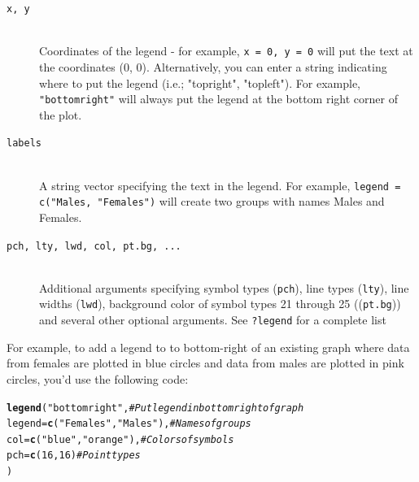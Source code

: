 \documentclass{tufte-book}\usepackage[]{graphicx}\usepackage[]{color}
\makeatletter
\newcommand{\hlnum}[1]{\textcolor[rgb]{0.686,0.059,0.569}{#1}}%
\newcommand{\hlstr}[1]{\textcolor[rgb]{0.192,0.494,0.8}{#1}}%
\newcommand{\hlcom}[1]{\textcolor[rgb]{0.678,0.584,0.686}{\textit{#1}}}%
\newcommand{\hlstd}[1]{\textcolor[rgb]{0.345,0.345,0.345}{#1}}%
\newcommand{\hlkwc}[1]{\textcolor[rgb]{0.333,0.667,0.333}{#1}}%
\newcommand{\hlkwd}[1]{\textcolor[rgb]{0.737,0.353,0.396}{\textbf{#1}}}%
\newenvironment{kframe}{%
 \def\at@end@of@kframe{}%
 \ifinner\ifhmode%
  \def\at@end@of@kframe{\end{minipage}}%
  \begin{minipage}{\columnwidth}%
 \fi\fi%
 \def\FrameCommand##1{\hskip\@totalleftmargin \hskip-\fboxsep
 \colorbox{shadecolor}{##1}\hskip-\fboxsep
     \hskip-\linewidth \hskip-\@totalleftmargin \hskip\columnwidth}%
 \MakeFramed {\advance\hsize-\width
   \@totalleftmargin\z@ \linewidth\hsize
   \@setminipage}}%
 {\par\unskip\endMakeFramed%
 \at@end@of@kframe}
\newenvironment{knitrout}{}{} %
\makeatother
\begin{document}
\begin{footnotesize}
{{\hline

\begin{description}

\item[\tt{x, y}] \hfill \\
Coordinates of the legend - for example, \texttt{x = 0, y = 0} will put the text at the coordinates (0, 0). Alternatively, you can enter a string indicating where to put the legend (i.e.; "topright", "topleft"). For example, \texttt{"bottomright"} will always put the legend at the bottom right corner of the plot.

\item[\tt{labels}] \hfill \\
  A string vector specifying the text in the legend. For example, \texttt{legend = c("Males, "Females")} will create two groups with names Males and Females.
  
\item[\tt{pch, lty, lwd, col, pt.bg, ...}] \hfill \\
Additional arguments specifying symbol types (\texttt{pch}), line types (\texttt{lty}), line widths (\texttt{lwd}), background color of symbol types 21 through 25 ((\texttt{pt.bg})) and several other optional arguments. See \texttt{?legend} for a complete list


\end{description}

}
}
\vspace{5mm} %


For example, to add a legend to to bottom-right of an existing graph where data from females are plotted in blue circles and data from males are plotted in pink circles, you'd use the following code:

\begin{knitrout}
\color{fgcolor}\begin{kframe}
\begin{alltt}
\hlkwd{legend}\hlstd{(}\hlstr{"bottomright"}\hlstd{,} \hlcom{# Put legend in bottom right of graph}
       \hlkwc{legend} \hlstd{=} \hlkwd{c}\hlstd{(}\hlstr{"Females"}\hlstd{,} \hlstr{"Males"}\hlstd{),} \hlcom{# Names of groups}
       \hlkwc{col} \hlstd{=} \hlkwd{c}\hlstd{(}\hlstr{"blue"}\hlstd{,} \hlstr{"orange"}\hlstd{),} \hlcom{# Colors of symbols}
       \hlkwc{pch} \hlstd{=} \hlkwd{c}\hlstd{(}\hlnum{16}\hlstd{,} \hlnum{16}\hlstd{)} \hlcom{# Point types}
       \hlstd{)}
\end{alltt}
\end{kframe}
\end{knitrout}


\end{footnotesize}
\end{document}
